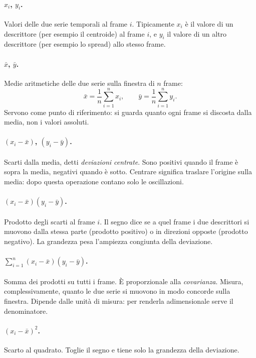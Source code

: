 \documentclass[a4paper,11pt]{article}
\begin{document}
\paragraph{$x_i$, $y_i$.} Valori delle due serie temporali al frame $i$.
Tipicamente $x_i$ è il valore di un descrittore (per esempio il
centroide) al frame $i$, e $y_i$ il valore di un altro descrittore (per
esempio lo spread) allo stesso frame.

\paragraph{$\bar x$, $\bar y$.} Medie aritmetiche delle due serie sulla
finestra di $n$ frame:
\[
\bar x = \frac{1}{n}\sum_{i=1}^{n} x_i, \qquad
\bar y = \frac{1}{n}\sum_{i=1}^{n} y_i.
\]
Servono come punto di riferimento: si guarda quanto ogni frame si
discosta dalla media, non i valori assoluti.

\paragraph{$(x_i - \bar x)$, $(y_i - \bar y)$.} Scarti dalla media,
detti \emph{deviazioni centrate}. Sono positivi quando il frame è sopra
la media, negativi quando è sotto. Centrare significa traslare l'origine
sulla media: dopo questa operazione contano solo le oscillazioni.

\paragraph{$(x_i - \bar x)(y_i - \bar y)$.} Prodotto degli scarti al
frame $i$. Il segno dice se a quel frame i due descrittori si muovono
dalla stessa parte (prodotto positivo) o in direzioni opposte (prodotto
negativo). La grandezza pesa l'ampiezza congiunta della deviazione.

\paragraph{$\sum_{i=1}^{n} (x_i - \bar x)(y_i - \bar y)$.} Somma dei
prodotti su tutti i frame. È proporzionale alla \emph{covarianza}.
Misura, complessivamente, quanto le due serie si muovono in modo
concorde sulla finestra. Dipende dalle unità di misura: per renderla
adimensionale serve il denominatore.

\paragraph{$(x_i - \bar x)^2$.} Scarto al quadrato. Toglie il segno e
tiene solo la grandezza della deviazione.
\end{document}
